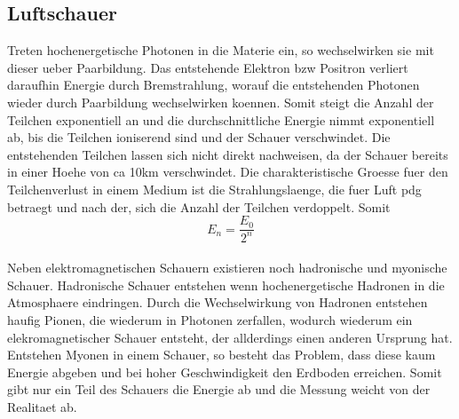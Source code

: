 \subsection{Luftschauer}
Treten hochenergetische Photonen in die Materie ein, so wechselwirken sie mit dieser ueber Paarbildung. Das entstehende Elektron bzw Positron verliert daraufhin Energie durch Bremstrahlung, worauf die entstehenden Photonen wieder durch Paarbildung wechselwirken koennen. Somit steigt die Anzahl der Teilchen exponentiell an und die durchschnittliche Energie nimmt exponentiell ab, bis die Teilchen ioniserend sind und der Schauer verschwindet. Die entstehenden Teilchen lassen sich nicht direkt nachweisen, da der Schauer bereits in einer Hoehe von ca 10km verschwindet. Die charakteristische Groesse fuer den Teilchenverlust in einem Medium ist die Strahlungslaenge, die fuer Luft pdg betraegt und nach der, sich die Anzahl der Teilchen verdoppelt. Somit
\begin{equation}
E_n=\frac{E_0}{2^n}
\end{equation}\\
Neben elektromagnetischen Schauern existieren noch hadronische und myonische Schauer. Hadronische Schauer entstehen wenn hochenergetische Hadronen in die Atmosphaere eindringen. Durch die Wechselwirkung von Hadronen entstehen haufig Pionen, die wiederum in Photonen zerfallen, wodurch wiederum ein elekromagnetischer Schauer entsteht, der allderdings einen anderen Ursprung hat. Entstehen Myonen in einem Schauer, so besteht das Problem, dass diese kaum Energie abgeben und bei hoher Geschwindigkeit den Erdboden erreichen. Somit gibt nur ein Teil des Schauers die Energie ab und die Messung weicht von der Realitaet ab.

